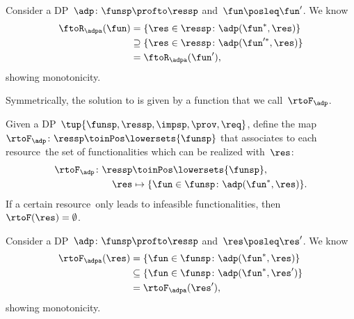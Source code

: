 \begin{remark}[Monotonicity]
    Consider a DP~$\adp\colon\funsp\profto\ressp$ and~$\fun\posleq \fun'$.
    We know
    \begin{equation*}
        \begin{aligned}
            \ftoR_\adpa(\fun)&=\{ \res \in \ressp \colon \adp(\fun^*, \res)\} \\
            &\supseteq \{ \res \in \ressp \colon \adp(\fun'^*, \res)\}\\
            &=\ftoR_\adpa(\fun'),
        \end{aligned}
    \end{equation*}
    showing monotonicity.
\end{remark}


Symmetrically, the solution to \FixResMaxFun is given by a function that we call~$\rtoF_\adp$.

\begin{definition}
    \label{def:rtoF-dp}
    Given a DP~$\tup{ \funsp,\ressp,\impsp,\prov,\req}$, define the map~$\rtoF_{\adp}\colon \ressp\toinPos  \lowersets{\funsp}$ that associates to each resource~\res the set of functionalities which can be realized with~$\res$:
    \begin{equation*}
        \begin{aligned}
            \rtoF_{\adp}\colon \ressp & \toinPos \lowersets{\funsp},\\
            \res& \mapsto \{ \fun \in \funsp \colon \adp(\fun^*, \res)\}.
        \end{aligned}
    \end{equation*}
    If a certain resource~\res only leads to infeasible functionalities, then~$\rtoF(\res)=\emptyset$.
\end{definition}

\begin{remark}[Monotonicity]
    Consider a DP~$\adp\colon\funsp\profto\ressp$ and~$\res\posleq \res'$.
    We know
    \begin{equation*}
        \begin{aligned}
            \rtoF_\adpa(\res)&=\{ \fun \in \funsp \colon \adp(\fun^*, \res)\} \\
            &\subseteq \{ \fun \in \funsp \colon \adp(\fun^*, \res')\}\\
            &=\rtoF_\adpa(\res'),
        \end{aligned}
    \end{equation*}
    showing monotonicity.
\end{remark}

